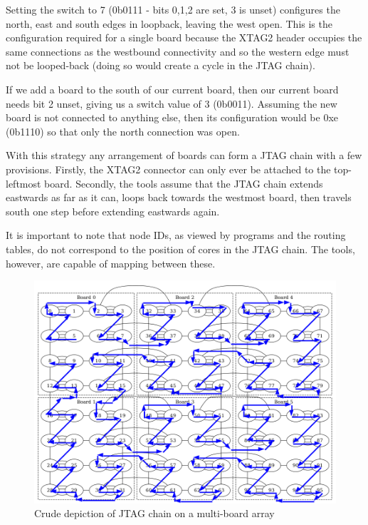 \documentclass[12pt,a4paper,final,twoside]{article}
\begin{document}
Setting the switch to 7 (0b0111 - bits 0,1,2 are set, 3 is unset) configures the north, east and south edges in loopback, leaving the west open. This is the configuration required for a single board because the XTAG2 header occupies the same connections as the westbound connectivity and so the western edge must not be looped-back (doing so would create a cycle in the JTAG chain).

If we add a board to the south of our current board, then our current board needs bit 2 unset, giving us a switch value of 3 (0b0011). Assuming the new board is not connected to anything else, then its configuration would be 0xe (0b1110) so that only the north connection was open.

With this strategy any arrangement of boards can form a JTAG chain with a few provisions. Firstly, the XTAG2 connector can only ever be attached to the top-leftmost board. Secondly, the tools assume that the JTAG chain extends eastwards as far as it can, loops back towards the westmost board, then travels south one step before extending eastwards again.

It is important to note that node IDs, as viewed by programs and the routing tables, do not correspond to the position of cores in the JTAG chain. The tools, however, are capable of mapping between these.

\begin{figure}[htbp]
\centering
\includegraphics[scale=0.6]{jtag-3x2.png}
\caption{Crude depiction of JTAG chain on a multi-board array}
\end{figure}
\end{document}
